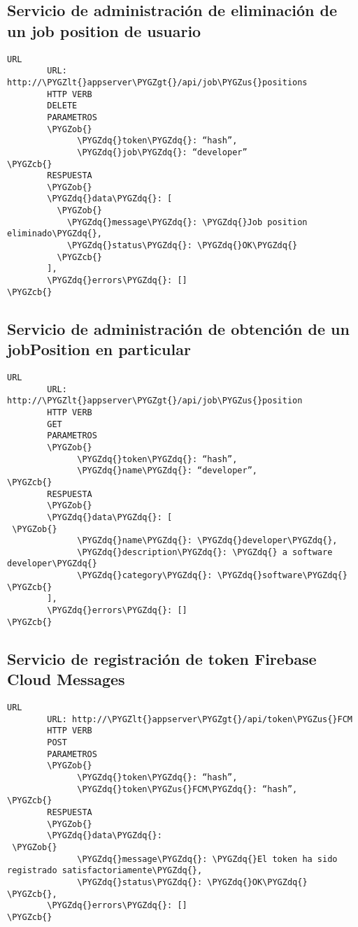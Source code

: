 \documentclass[a4paper,10pt,spanish]{sphinxmanual}
\def\PYGZus{\char`\_}
\def\PYGZob{\char`\{}
\def\PYGZcb{\char`\}}
\def\PYGZlt{\char`\<}
\def\PYGZgt{\char`\>}
\def\PYGZdq{\char`\"}
\begin{document}
\subsection{Servicio de administración de eliminación de un job position de usuario}
\label{apiRest:servicio-de-administracion-de-eliminacion-de-un-job-position-de-usuario}
\begin{Verbatim}[commandchars=\\\{\}]
URL
        URL: http://\PYGZlt{}appserver\PYGZgt{}/api/job\PYGZus{}positions
        HTTP VERB
        DELETE
        PARAMETROS
        \PYGZob{}
              \PYGZdq{}token\PYGZdq{}: “hash”,
              \PYGZdq{}job\PYGZdq{}: “developer”
\PYGZcb{}
        RESPUESTA
        \PYGZob{}
        \PYGZdq{}data\PYGZdq{}: [
          \PYGZob{}
            \PYGZdq{}message\PYGZdq{}: \PYGZdq{}Job position eliminado\PYGZdq{},
            \PYGZdq{}status\PYGZdq{}: \PYGZdq{}OK\PYGZdq{}
          \PYGZcb{}
        ],
        \PYGZdq{}errors\PYGZdq{}: []
\PYGZcb{}
\end{Verbatim}


\subsection{Servicio de administración de obtención de un jobPosition en particular}
\label{apiRest:servicio-de-administracion-de-obtencion-de-un-jobposition-en-particular}
\begin{Verbatim}[commandchars=\\\{\}]
URL
        URL: http://\PYGZlt{}appserver\PYGZgt{}/api/job\PYGZus{}position
        HTTP VERB
        GET
        PARAMETROS
        \PYGZob{}
              \PYGZdq{}token\PYGZdq{}: “hash”,
              \PYGZdq{}name\PYGZdq{}: “developer”,
\PYGZcb{}
        RESPUESTA
        \PYGZob{}
        \PYGZdq{}data\PYGZdq{}: [
 \PYGZob{}
              \PYGZdq{}name\PYGZdq{}: \PYGZdq{}developer\PYGZdq{},
              \PYGZdq{}description\PYGZdq{}: \PYGZdq{} a software developer\PYGZdq{}
              \PYGZdq{}category\PYGZdq{}: \PYGZdq{}software\PYGZdq{}
\PYGZcb{}
        ],
        \PYGZdq{}errors\PYGZdq{}: []
\PYGZcb{}
\end{Verbatim}


\subsection{Servicio de registración de token Firebase Cloud Messages}
\label{apiRest:servicio-de-registracion-de-token-firebase-cloud-messages}
\begin{Verbatim}[commandchars=\\\{\}]
URL
        URL: http://\PYGZlt{}appserver\PYGZgt{}/api/token\PYGZus{}FCM
        HTTP VERB
        POST
        PARAMETROS
        \PYGZob{}
              \PYGZdq{}token\PYGZdq{}: “hash”,
              \PYGZdq{}token\PYGZus{}FCM\PYGZdq{}: “hash”,
\PYGZcb{}
        RESPUESTA
        \PYGZob{}
        \PYGZdq{}data\PYGZdq{}:
 \PYGZob{}
              \PYGZdq{}message\PYGZdq{}: \PYGZdq{}El token ha sido registrado satisfactoriamente\PYGZdq{},
              \PYGZdq{}status\PYGZdq{}: \PYGZdq{}OK\PYGZdq{}
\PYGZcb{},
        \PYGZdq{}errors\PYGZdq{}: []
\PYGZcb{}
\end{Verbatim}
\end{document}
